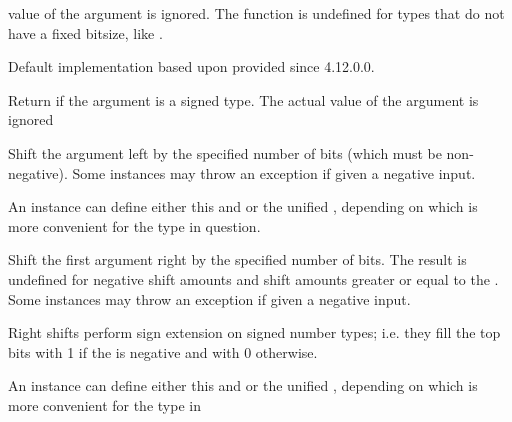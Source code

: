 \begin{haddockdesc}
{\begin{haddockdesc}
{        value of the argument is ignored.  The function  is
        undefined for types that do not have a fixed bitsize, like .\par
Default implementation based upon  provided since
        4.12.0.0.\par}
\end{haddockdesc}
\begin{haddockdesc}
\item[\begin{tabular}{@{}l}
isSigned :: a -> Bool
\end{tabular}]
{\haddockbegindoc
Return  if the argument is a signed type.  The actual
        value of the argument is ignored \par}
\end{haddockdesc}
\begin{haddockdesc}
\item[\begin{tabular}{@{}l}
shiftL :: a -> Int -> a
\end{tabular}]
{\haddockbegindoc
Shift the argument left by the specified number of bits
        (which must be non-negative). Some instances may throw an
         exception if given a negative input.\par
An instance can define either this and  or the unified
        , depending on which is more convenient for the type in
        question. \par}
\end{haddockdesc}
\begin{haddockdesc}
\item[\begin{tabular}{@{}l}
shiftR :: a -> Int -> a
\end{tabular}]
{\haddockbegindoc
Shift the first argument right by the specified number of bits. The
        result is undefined for negative shift amounts and shift amounts
        greater or equal to the . Some instances may throw an
         exception if given a negative input.\par
Right shifts perform sign extension on signed number types;
        i.e. they fill the top bits with 1 if the  is negative
        and with 0 otherwise.\par
An instance can define either this and  or the unified
        , depending on which is more convenient for the type in
}
\end{haddockdesc}}
\end{haddockdesc}
